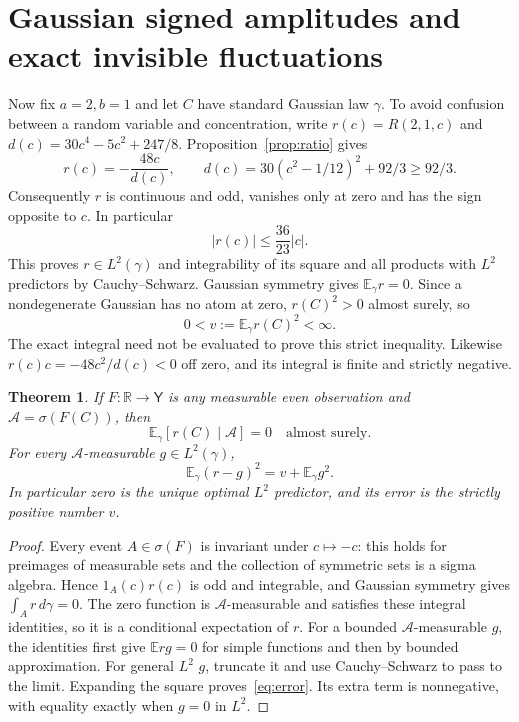 \documentclass[11pt]{article}
\newtheorem{theorem}{Theorem}[section]
\newcommand{\R}{\mathbb R}\newcommand{\Z}{\mathbb Z}
\newcommand{\E}{\mathbb E}\newcommand{\Var}{\operatorname{Var}}
\begin{document}
\section{Gaussian signed amplitudes and exact invisible fluctuations}
Now fix $a=2,b=1$ and let $C$ have standard Gaussian law $\gamma$.
To avoid confusion between a random variable and concentration, write
$r(c)=R(2,1,c)$ and $d(c)=30c^4-5c^2+247/8$. Proposition~\ref{prop:ratio}
gives
\begin{equation}\label{eq:r}
 r(c)=-\frac{48c}{d(c)},\qquad
 d(c)=30(c^2-1/12)^2+92/3\geq92/3.
\end{equation}
Consequently $r$ is continuous and odd, vanishes only at zero and has
the sign opposite to $c$. In particular
\[
 |r(c)|\leq\frac{36}{23}|c|.
\]
This proves $r\in L^2(\gamma)$ and integrability of its square and
all products with $L^2$ predictors by Cauchy--Schwarz. Gaussian
symmetry gives $\E_\gamma r=0$. Since a nondegenerate Gaussian has
no atom at zero, $r(C)^2>0$ almost surely, so
\begin{equation}\label{eq:v}
 0<v:=\E_\gamma r(C)^2<\infty.
\end{equation}
The exact integral need not be evaluated to prove this strict
inequality. Likewise $r(c)c=-48c^2/d(c)<0$ off zero, and its
integral is finite and strictly negative.

\begin{theorem}\label{thm:conditional}
If $F:\R\to\mathsf Y$ is any measurable even observation and
$\mathcal A=\sigma(F(C))$, then
\[
 \E_\gamma[r(C)\mid\mathcal A]=0\quad\text{almost surely}.
\]
For every $\mathcal A$-measurable $g\in L^2(\gamma)$,
\begin{equation}\label{eq:error}
 \E_\gamma(r-g)^2=v+\E_\gamma g^2.
\end{equation}
In particular zero is the unique optimal $L^2$ predictor, and its
error is the strictly positive number $v$.
\end{theorem}
\begin{proof}
Every event $A\in\sigma(F)$ is invariant under $c\mapsto-c$:
this holds for preimages of measurable sets and the collection of
symmetric sets is a sigma algebra. Hence $1_A(c)r(c)$ is odd and
integrable, and Gaussian symmetry gives $\int_A r\,d\gamma=0$.
The zero function is $\mathcal A$-measurable and satisfies these
integral identities, so it is a conditional expectation of $r$.
For a bounded $\mathcal A$-measurable $g$, the identities first give
$\E rg=0$ for simple functions and then by bounded approximation.
For general $L^2$ $g$, truncate it and use Cauchy--Schwarz to pass
to the limit. Expanding the square proves~\eqref{eq:error}.
Its extra term is nonnegative, with equality exactly when $g=0$
in $L^2$.
\end{proof}
\end{document}
